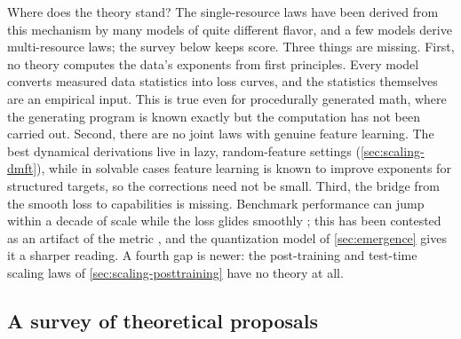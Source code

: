 \documentclass[11pt]{article}
\begin{document}
Where does the theory stand? The single-resource laws have been derived from this mechanism by many models of quite different flavor, and a few models derive multi-resource laws; the survey below keeps score. Three things are missing. First, no theory computes the data's exponents from first principles. Every model converts measured data statistics into loss curves, and the statistics themselves are an empirical input. This is true even for procedurally generated math, where the generating program is known exactly but the computation has not been carried out. Second, there are no joint laws with genuine feature learning. The best dynamical derivations live in lazy, random-feature settings (\cref{sec:scaling-dmft}), while in solvable cases feature learning is known to improve exponents for structured targets, so the corrections need not be small. Third, the bridge from the smooth loss to capabilities is missing. Benchmark performance can jump within a decade of scale while the loss glides smoothly \cite{wei2022emergent}; this has been contested as an artifact of the metric \cite{schaeffer2023emergent}, and the quantization model of \cref{sec:emergence} gives it a sharper reading. A fourth gap is newer: the post-training and test-time scaling laws of \cref{sec:scaling-posttraining} have no theory at all.

\subsection{A survey of theoretical proposals}
\label{sec:scaling-survey}
\end{document}
